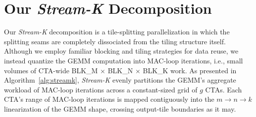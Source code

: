 \section{Our \emph{Stream-K} Decomposition} Our \emph{Stream-K} decomposition is a tile-splitting parallelization in which the splitting seams are completely dissociated from the tiling structure itself. Although we employ familiar blocking and tiling strategies for data reuse, we instead quantize the GEMM computation into MAC-loop iterations, i.e., small volumes of CTA-wide BLK\_M $\times$ BLK\_N $\times$ BLK\_K work. As presented in Algorithm~\ref{alg:streamk}, \emph{Stream-K} evenly partitions the GEMM's aggregate workload of MAC-loop iterations across a constant-sized grid of $g$ CTAs. Each CTA's range of MAC-loop iterations is mapped contiguously into the $m \rightarrow n \rightarrow k$ linearization of the GEMM shape, crossing output-tile boundaries as it may.

